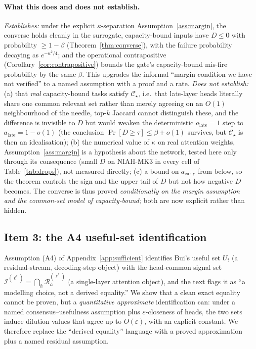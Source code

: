 \paragraph{What this does and does not establish.}
\emph{Establishes:} under the explicit $\kappa$-separation
Assumption~\ref{ass:margin}, the converse holds cleanly in the
surrogate, capacity-bound inputs have $D\le0$ with probability $\ge1-\beta$
(Theorem~\ref{thm:converse}), with the failure probability decaying as
$e^{-\kappa^2/4}$; and the operational contrapositive
(Corollary~\ref{cor:contrapositive}) bounds the gate's capacity-bound
mis-fire probability by the same $\beta$. This upgrades the informal ``margin
condition we have not verified'' to a named assumption with a proof and a
rate. \emph{Does not establish:} (a) that \emph{real} capacity-bound tasks
satisfy $\mathcal{C}_\star$, i.e.\ that late-layer heads literally share one
common relevant set rather than merely agreeing on an $O(1)$ neighbourhood of
the needle, top-$k$ Jaccard cannot distinguish these, and the difference is
invisible to $D$ but would weaken the deterministic $a_{\mathrm{late}}=1$ step
to $a_{\mathrm{late}}=1-o(1)$ (the conclusion $\Pr[D\ge\tau]\le\beta+o(1)$
survives, but $\mathcal{C}_\star$ is then an idealisation); (b) the numerical
value of $\kappa$ on real attention weights, Assumption~\ref{ass:margin} is a
hypothesis about the network, tested here only through its consequence (small
$D$ on NIAH-MK3 in every cell of Table~\ref{tab:drops}), not measured directly;
(c) a bound on $a_{\mathrm{early}}$ from below, so the theorem controls the sign
and the upper tail of $D$ but not how negative $D$ becomes. The converse is
thus proved \emph{conditionally on the margin assumption and the common-set
model of capacity-bound}; both are now explicit rather than hidden.

\subsection{Item 3: the A4 useful-set identification}
\label{app:a4}

Assumption (A4) of Appendix~\ref{app:sufficient} identifies Bui's useful set
$U_t$ (a residual-stream, decoding-step object) with the head-common signal
set $\mathcal{I}^{(\ell^*)}=\bigcap_h\mathcal{R}^{(\ell^*)}_h$ (a single-layer
attention object), and the text flags it as ``a modelling choice, not a derived
equality.'' We show that a clean exact equality cannot be proven, but a
\emph{quantitative approximate} identification can: under a named
consensus--usefulness assumption plus $\varepsilon$-closeness of heads, the two
sets induce dilution values that agree up to $O(\varepsilon)$, with an explicit
constant. We therefore replace the ``derived equality'' language with a proved
approximation plus a named residual assumption.


